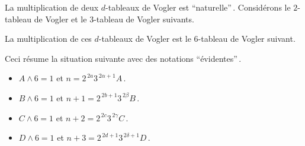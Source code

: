 \begin{example}
	La multiplication de deux $d$-tableaux de Vogler est \enquote{naturelle}\,. Considérons le $2$-tableau de Vogler et le $3$-tableau de Vogler suivants.
	
	\begin{multicols}{2}
	\begin{center}
	\end{center}

	\begin{center}
	\end{center}
	\end{multicols}


	La multiplication de ces $d$-tableaux de Vogler est le $6$-tableau de Vogler suivant.

	\begin{center}
	\end{center}
	
	Ceci résume la situation suivante avec des notations \enquote{évidentes}\,. 
	
	\begin{itemize}
		\item $A \wedge 6 = 1$
		      et
		      $n     = 2^{\,2a}   3^{\,2\alpha+1} A$\,.

		\item $B \wedge 6 = 1$
		      et
		      $n + 1 = 2^{\,2b+1} 3^{\,2\beta}    B$\,.

		\item $C \wedge 6 = 1$
		      et
		      $n + 2 = 2^{\,2c}   3^{\,2\gamma}   C$\,.

		\item $D \wedge 6 = 1$
		      et
		      $n + 3 = 2^{\,2d+1} 3^{\,2\delta+1} D$\,.
	\end{itemize}
\end{example}



